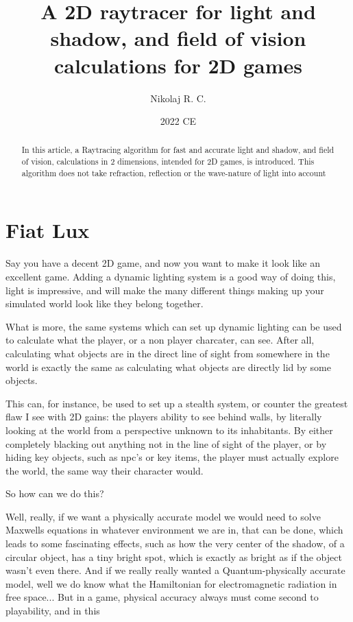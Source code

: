 \documentclass[a4paper,12pt,article]{memoir}
\title{A 2D raytracer for light and shadow, and field of vision calculations for 2D games}
\author{Nikolaj R. C.}
\date{2022 CE} %
\begin{document}
\maketitle

\begin{abstract}

In this article, a Raytracing algorithm for fast and accurate light and shadow, and field of vision, calculations in 2 dimensions, intended for 2D games, is introduced. This algorithm does not take refraction, reflection or the wave-nature of light into account

\end{abstract}

\chapter{Fiat Lux}
Say you have a decent 2D game, and now you want to make it look like an excellent game. Adding a dynamic lighting system is a good way of doing this, light is impressive, and will make the many different things making up your simulated world look like they belong together.

What is more, the same systems which can set up dynamic lighting can be used to calculate what the player, or a non player charcater, can see. After all, calculating what objects are in the direct line of sight from somewhere in the world is exactly the same as calculating what objects are directly lid by some objects.

This can, for instance, be used to set up a stealth system, or counter the greatest flaw I see with 2D gains: the players ability to see behind walls, by literally looking at the world from a perspective unknown to its inhabitants. By either completely blacking out anything not in the line of sight of the player, or by hiding key objects, such as npc's or key items, the player must actually explore the world, the same way their character would.

So how can we do this?

Well, really, if we want a physically accurate model we would need to solve Maxwells equations in whatever environment we are in, that can be done, which leads to some fascinating effects, such as how the very center of the shadow, of a circular object, has a tiny bright spot, which is exactly as bright as if the object wasn't even there. And if we really really wanted a Quantum-physically accurate model, well we do know what the Hamiltonian for electromagnetic radiation in free space... But in a game, physical accuracy always must come second to playability, and in this
\end{document}

